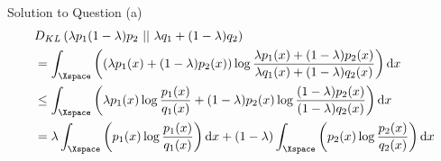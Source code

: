 \documentclass[aspectratio=169]{beamer}
\newcommand{\kld}[1]{D_{KL}\left(#1\right)}
\begin{document}
\begin{frame}{Solution to Question (a)}
	\small
	\begin{align*}
		& \kld{\lambda p_1 (1 - \lambda) p_2 \ || \ \lambda q_1 + (1-\lambda) q_2}  \\
		&= \int_\Xspace \left( (\lambda p_1(x) + (1 - \lambda) p_2(x)) \log \frac{\lambda p_1(x) + (1 - \lambda) p_2(x)}{\lambda q_1(x) + (1 - \lambda) q_2(x)} \right) \mathrm{d}x \\
		&\leq \int_\Xspace \left( \lambda p_1(x) \log \frac{p_1(x)}{q_1(x)} + (1-\lambda) p_2(x) \log \frac{(1 - \lambda) p_2(x)}{(1-\lambda) q_2(x)} \right) \mathrm{d}x \\
		&= \lambda \int_\Xspace \left(p_1(x) \log \frac{p_1(x)}{q_1(x)} \right) \mathrm{d}x + (1 - \lambda) \int_\Xspace \left( p_2(x) \log \frac{p_2(x)}{q_2(x)}\right) \mathrm{d}x \\
	\end{align*}
\end{frame}
\end{document}
